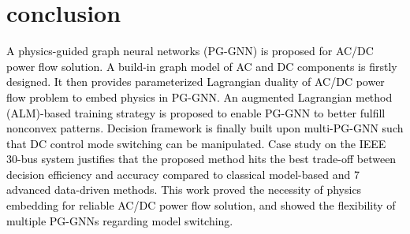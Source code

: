 \documentclass[lettersize,journal]{IEEEtran}
\begin{document}
\section{conclusion}
\textcolor{black}{A physics-guided graph neural networks (PG-GNN) is proposed for AC/DC power flow solution. A build-in graph model of AC and DC components is firstly designed. It then provides parameterized Lagrangian duality of AC/DC power flow problem to embed physics in PG-GNN. An augmented Lagrangian method (ALM)-based training strategy is proposed to enable PG-GNN to better fulfill nonconvex patterns. Decision framework is finally built upon multi-PG-GNN such that DC control mode switching can be manipulated. Case study on the IEEE 30-bus system justifies that the proposed method hits the best trade-off between decision efficiency and accuracy compared to classical model-based and 7 advanced data-driven methods. This work proved the necessity of physics embedding for reliable AC/DC power flow solution, and showed the flexibility of multiple PG-GNNs regarding model switching.}
\vspace{-1ex}


\end{document}
